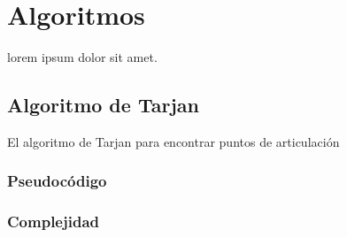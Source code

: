 

\section{Algoritmos}\label{algorithms}
lorem ipsum dolor sit amet.

\subsection{Algoritmo de Tarjan}
El algoritmo de Tarjan para encontrar puntos de articulación
\subsubsection{Pseudocódigo}
\subsubsection{Complejidad}
